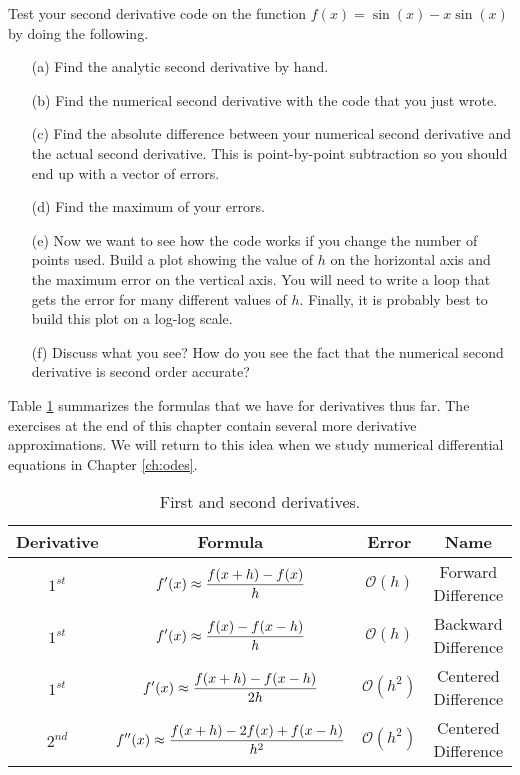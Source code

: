 \begin{problem}
    Test your second derivative code on the function $f(x) = \sin(x) - x\sin(x)$ by doing
    the following.  
    \begin{enumerate}
        \item[(a)] Find the analytic second derivative by hand.
        \item[(b)] Find the numerical second derivative with the code that you just wrote.
        \item[(c)] Find the absolute difference between your numerical second derivative
            and the actual second derivative.  This is point-by-point subtraction so you
            should end up with a vector of errors. 
        \item[(d)] Find the maximum of your errors.
        \item[(e)] Now we want to see how the code works if you change the number of
            points used.  Build a plot showing the value of $h$ on the horizontal axis
            and the maximum error on the vertical axis.  You will need to write a loop
            that gets the error for many different values of $h$.  Finally, it is probably
            best to build this plot on a log-log scale.
        \item[(f)] Discuss what you see?  How do you see the fact that the numerical
            second derivative is second order accurate?
    \end{enumerate}
\end{problem}

Table \ref{tab:first_and_second_derivatives} summarizes the formulas that we have for
derivatives thus far. The exercises at the end of this chapter contain several more
derivative approximations.  We will return to this idea when we study numerical
differential equations in Chapter \ref{ch:odes}.
\begin{table}
    \centering
    \begin{tabular}{|c|c|c|c|}
        \hline
        Derivative & Formula & Error & Name \\ \hline \hline
        $1^{st}$ & $\displaystyle f'(x) \approx \frac{f(x+h) - f(x)}{h}$ & $\mathcal{O}(h)$ & Forward
        Difference \\ \hline
        $1^{st}$ & $\displaystyle f'(x) \approx \frac{f(x) - f(x-h)}{h}$ & $\mathcal{O}(h)$ & Backward
        Difference \\ \hline
        $1^{st}$ & $\displaystyle f'(x) \approx \frac{f(x+h) - f(x-h)}{2h}$ & $\mathcal{O}(h^2)$ &
        Centered Difference \\ \hline
        $2^{nd}$ & $\displaystyle f''(x) \approx \frac{f(x+h) - 2f(x) + f(x-h)}{h^2}$ &
        $\mathcal{O}(h^2)$ & Centered Difference \\ \hline
    \end{tabular}
    \caption{First and second derivatives.}
    \label{tab:first_and_second_derivatives}
\end{table}


